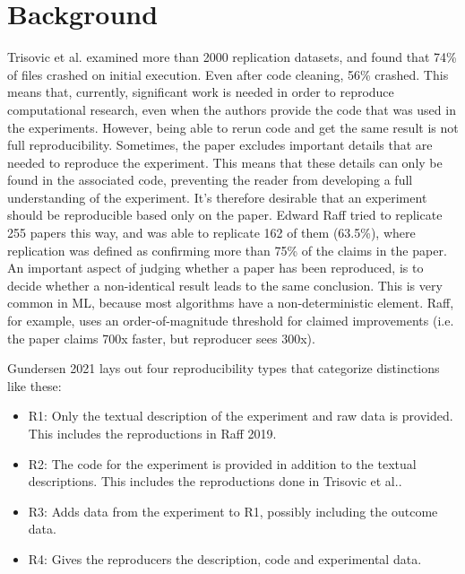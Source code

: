 \documentclass[8pt,a4paper]{article}
\begin{document}
\section{Background}
Trisovic et al.\cite{trisovic2021} examined more than 2000 replication datasets, and found that 74\% of files crashed on initial execution. 
Even after code cleaning, 56\% crashed. This means that, currently, significant work is needed in order to reproduce computational research,
even when the authors provide the code that was used in the experiments. However, being able to rerun code and get the same result is not full reproducibility.
Sometimes, the paper excludes important details that are needed to reproduce the experiment. %
This means that these details can only be found in the associated code,
preventing the reader from developing a full understanding of the experiment. 
It's therefore desirable that an experiment should be reproducible based only on the paper.
Edward Raff\cite{raff2019} tried to replicate 255 papers this way, and was able to replicate 162 of them (63.5\%), 
where replication was defined as confirming more than 75\% of the claims in the paper.
An important aspect of judging whether a paper has been reproduced, is to decide whether a non-identical result leads to the same conclusion.
This is very common in ML, because most algorithms have a non-deterministic element. 
Raff\cite{raff2019}, for example, uses an order-of-magnitude threshold for claimed improvements (i.e. the paper claims 700x faster, but reproducer sees 300x).

Gundersen 2021\cite{gundersen2021} lays out four reproducibility types that categorize distinctions like these:
\begin{itemize}
    \item R1: Only the textual description of the experiment and raw data is provided.
        \subitem This includes the reproductions in Raff 2019\cite{raff2019}.
    \item R2: The code for the experiment is provided in addition to the textual descriptions.
        \subitem This includes the reproductions done in Trisovic et al.\cite{trisovic2021}.
    \item R3: Adds data from the experiment to R1, possibly including the outcome data.
    \item R4: Gives the reproducers the description, code and experimental data.
\end{itemize}
\end{document}
